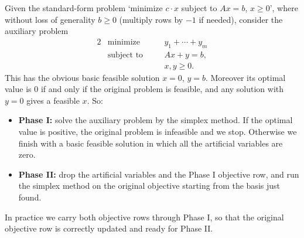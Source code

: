 \documentclass[a4paper]{scrartcl}
\begin{document}
Given the standard-form problem `minimize $c\cdot x$ subject to $Ax = b$, $x \geq 0$', where without loss of generality $b \geq 0$ (multiply rows by $-1$ if needed), consider the auxiliary problem
\begin{alignat*}{2}
    & \text{minimize} \quad && y_1 + \cdots + y_m \\
    & \text{subject to} \quad && Ax + y = b, \\
    & && x, y \geq 0.
\end{alignat*}
This has the obvious basic feasible solution $x = 0$, $y = b$. Moreover its optimal value is $0$ if and only if the original problem is feasible, and any solution with $y = 0$ gives a feasible $x$. So:
\begin{itemize}
    \item \textbf{Phase I:} solve the auxiliary problem by the simplex method. If the optimal value is positive, the original problem is infeasible and we stop. Otherwise we finish with a basic feasible solution in which all the artificial variables are zero.
    \item \textbf{Phase II:} drop the artificial variables and the Phase I objective row, and run the simplex method on the original objective starting from the basis just found.
\end{itemize}

In practice we carry both objective rows through Phase I, so that the original objective row is correctly updated and ready for Phase II.
\end{document}
